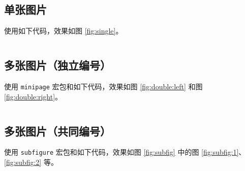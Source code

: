 \newpage
\subsection{单张图片}
使用如下代码，效果如图 \ref{fig:single}。

\inputminted{latex}{src/image-single.tex}


\newpage
\subsection{多张图片（独立编号）}
使用 \texttt{minipage} 宏包和如下代码，效果如图 \ref{fig:double:left} 和图 \ref{fig:double:right}。

\inputminted{latex}{src/image-double.tex}


\newpage
\subsection{多张图片（共同编号）}
使用 \texttt{subfigure} 宏包和如下代码，效果如图 \ref{fig:subfig} 中的图 \ref{fig:subfig:1}、\ref{fig:subfig:2} 等。

\inputminted{latex}{src/image-subfig.tex}

